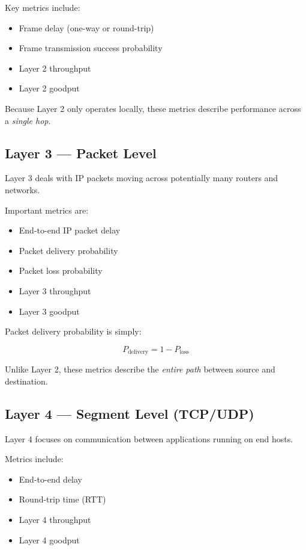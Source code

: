 Key metrics include:
\begin{itemize}[leftmargin=1.5em]
    \item Frame delay (one-way or round-trip)
    \item Frame transmission success probability
    \item Layer 2 throughput
    \item Layer 2 goodput
\end{itemize}

Because Layer 2 only operates locally, these metrics describe performance across
a \emph{single hop}.

\subsection{Layer 3 --- Packet Level}

Layer 3 deals with IP packets moving across potentially many routers and
networks.

Important metrics are:
\begin{itemize}[leftmargin=1.5em]
    \item End-to-end IP packet delay
    \item Packet delivery probability
    \item Packet loss probability
    \item Layer 3 throughput
    \item Layer 3 goodput
\end{itemize}

Packet delivery probability is simply:

\[
P_{\text{delivery}} = 1 - P_{\text{loss}}
\]

Unlike Layer 2, these metrics describe the \emph{entire path} between source
and destination.

\subsection{Layer 4 --- Segment Level (TCP/UDP)}

Layer 4 focuses on communication between applications running on end hosts.

Metrics include:
\begin{itemize}[leftmargin=1.5em]
    \item End-to-end delay
    \item Round-trip time (RTT)
    \item Layer 4 throughput
    \item Layer 4 goodput
\end{itemize}

